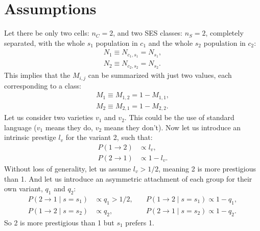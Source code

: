 \documentclass[../thesis.tex]{subfiles}
\begin{document}
\section*{Assumptions}
Let there be only two cells: $n_C = 2$, and two \ac{SES} classes: $n_S = 2$, completely
separated, with the whole $s_1$ population in $c_1$ and the whole $s_2$ population in
$c_2$:
\begin{equation}
    \begin{aligned}
        N_1 \equiv N_{c_1, s_1} = N_{s_1}, \\
        N_2 \equiv N_{c_2, s_2} = N_{s_2}.
    \end{aligned}
\end{equation}
This implies that the $M_{i,j}$ can be summarized with just two values, each
corresponding to a class:
\begin{equation}
    \begin{aligned}
        M_1 \equiv M_{1, 2} = 1 - M_{1, 1}, \\
        M_2 \equiv M_{2, 1} = 1 - M_{2, 2}.
    \end{aligned}
\end{equation}
Let us consider two varieties $v_1$ and $v_2$. This could be the use of standard
language ($v_1$ means they do, $v_2$ means they don't). Now let us introduce an
intrinsic prestige $l_v$ for the variant 2, such that:
\begin{equation}
    \begin{aligned}
        P(1 \rightarrow 2) &\propto l_v, \\
        P(2 \rightarrow 1) &\propto 1 - l_v.
    \end{aligned}
\end{equation}
Without loss of generality, let us assume $l_v > 1/2$, meaning 2 is more prestigious
than 1. And let us introduce an asymmetric attachment of each group for their own
variant, $q_1$ and $q_2$:
\begin{equation}
    \begin{aligned}
        P(2 \rightarrow 1 \mid s = s_1) &\propto q_1 > 1/2, \quad&  P(1 \rightarrow 2 \mid s = s_1) \propto 1 - q_1, \\
        P(1 \rightarrow 2 \mid s = s_2) &\propto q_2, \quad&  P(2 \rightarrow 1 \mid s = s_2) \propto 1 - q_2.
    \end{aligned}
\end{equation}
So 2 is more prestigious than 1 but $s_1$ prefers 1.
\end{document}
